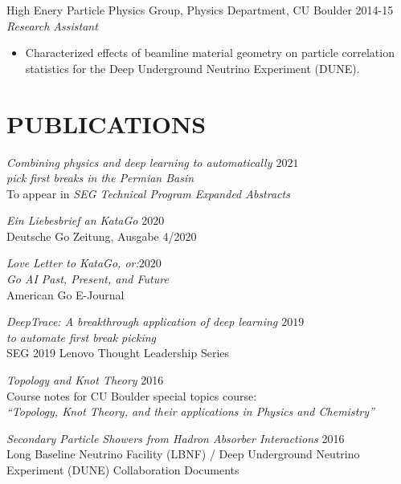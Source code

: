 \documentclass[margin]{res}
\begin{document}
\begin{resume}
                High Enery Particle Physics Group, Physics Department, CU Boulder  \hfill            2014-15 \\
		{\sl Research Assistant}
                 \begin{itemize}  \itemsep -2pt %
                 \item Characterized effects of beamline material geometry on particle
                   correlation statistics for the Deep Underground Neutrino Experiment
                   (DUNE).
                 \end{itemize}

\section{PUBLICATIONS} {\sl Combining physics and deep learning to automatically \hfill            $2021$ \\ pick first breaks in the Permian Basin} \\
		To appear in {\sl SEG Technical Program Expanded Abstracts}

                {\sl Ein Liebesbrief an KataGo} \hfill 2020 \\
                Deutsche Go Zeitung, Ausgabe 4/2020

                {\sl Love Letter to KataGo, or:\hfill $2020$\\ Go AI Past, Present, and Future} \\
                American Go E-Journal
                
                {\sl DeepTrace: A breakthrough application of deep learning \hfill $2019$\\ to automate first break picking}  \\
                SEG 2019 Lenovo Thought Leadership Series

                {\sl Topology and Knot Theory} \hfill 2016 \\
                Course notes for CU Boulder special topics course: \\
                \textit{``Topology, Knot Theory, and their applications in Physics and Chemistry''}
                
                {\sl Secondary Particle Showers from Hadron Absorber Interactions} \hfill 2016 \\
                Long Baseline Neutrino Facility (LBNF) / Deep Underground Neutrino Experiment (DUNE) Collaboration Documents

                

\end{resume}
\end{document}
